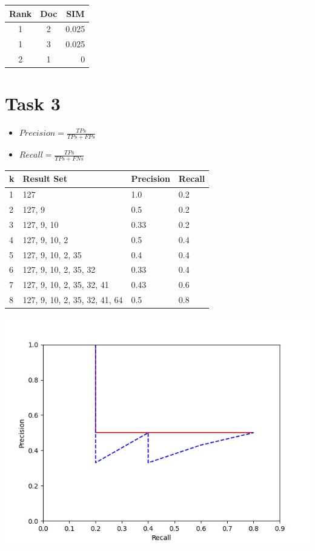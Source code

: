 \documentclass[a4paper]{scrartcl}
\begin{document}
\begin{tabular}{|c|c|r|}
    \hline
    \textbf{Rank} & \textbf{Doc} & \multicolumn{1}{c|}{\textbf{SIM}} \\ \hline
    1             & 2            & 0.025                                   \\ \hline
    1             & 3            & 0.025                             \\ \hline
    2             & 1            & 0                         \\ \hline
\end{tabular}


\pagebreak
\section*{Task 3}

\begin{itemize}
    \item $Precision = \frac{TPs}{TPs+FPs}$
    \item $Recall = \frac{TPs}{TPs+FNs}$
\end{itemize}

\begin{center}
    \begin{tabular}{@{}llll@{}}
    \hline
    \textbf{k} & \textbf{Result Set}           & \textbf{Precision} & \textbf{Recall} \\ \hline
    1          & 127                           & 1.0                & 0.2             \\
    2          & 127, 9                        & 0.5                & 0.2             \\
    3          & 127, 9, 10                    & 0.33               & 0.2             \\
    4          & 127, 9, 10, 2                 & 0.5                & 0.4             \\
    5          & 127, 9, 10, 2, 35             & 0.4                & 0.4             \\
    6          & 127, 9, 10, 2, 35, 32         & 0.33               & 0.4             \\
    7          & 127, 9, 10, 2, 35, 32, 41     & 0.43               & 0.6             \\
    8          & 127, 9, 10, 2, 35, 32, 41, 64 & 0.5                & 0.8             \\ \hline
    \end{tabular}
    
    \includegraphics[width=.7\textwidth]{img/fig.jpg}
\end{center}
\end{document}
